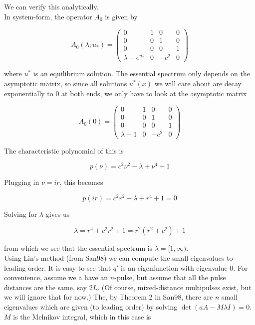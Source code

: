 \documentclass[12pt]{article}
\begin{document}
We can verify this analytically.\\

In system-form, the operator $A_0$ is given by

\begin{equation}
A_0(\lambda; u_*) = \begin{pmatrix}
0 & 1 & 0 & 0 \\
0 & 0 & 1 & 0 \\
0 & 0 & 0 & 1 \\
\lambda - e^{u_*} & 0 & -c^2 & 0 
\end{pmatrix}
\end{equation}

where $u^*$ is an equilibrium solution. The essential spectrum only depends on the asymptotic matrix, so since all solutions $u^*(x)$ we will care about are decay exponentially to 0 at both ends, we only have to look at the asymptotic matrix

\begin{equation}
A_0(0) = \begin{pmatrix}
0 & 1 & 0 & 0 \\
0 & 0 & 1 & 0 \\
0 & 0 & 0 & 1 \\
\lambda - 1 & 0 & -c^2 & 0 
\end{pmatrix}
\end{equation}

The characteristic polynomial of this is

\[
p(\nu) = c^2 \nu^2 - \lambda + \nu^4 + 1
\]

Plugging in $\nu = i r$, this becomes

\[
p(i r) = c^2 r^2 - \lambda + r^4 + 1 = 0
\]

Solving for $\lambda$ gives us

\[
\lambda = r^4 + c^2 r^2 + 1 = r^2(r^2 + c^2) + 1
\]

from which we see that the essential spectrum is $\lambda = [1, \infty)$.\\

Using Lin's method (from San98) we can compute the small eigenvalues to leading order. It is easy to see that $q'$ is an eigenfunction with eigenvalue 0. For convenience, assume we a have an $n$-pulse, but assume that all the pulse distances are the same, say $2L$. (Of course, mixed-distance multipulses exist, but we will ignore that for now.) The, by Theorem 2 in San98, there are $n$ small eigenvalues which are given (to leading order) by solving $\det(aA - M \lambda I) = 0$. $M$ is the Melnikov integral, which in this case is
\end{document}
